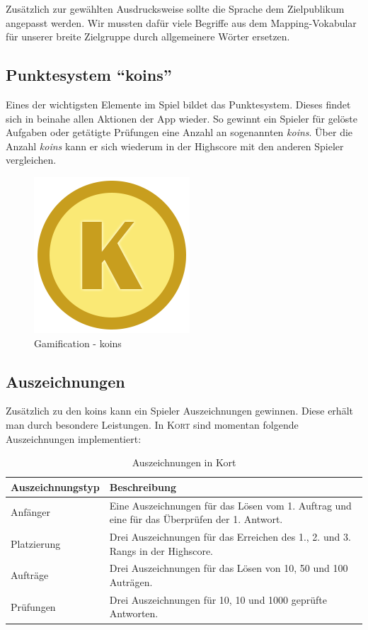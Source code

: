 Zusätzlich zur gewählten Ausdrucksweise sollte die Sprache dem Zielpublikum angepasst werden.
Wir mussten dafür viele Begriffe aus dem Mapping-Vokabular für unserer breite Zielgruppe durch allgemeinere Wörter ersetzen.

\subsection{Punktesystem "`koins"'}
Eines der wichtigsten Elemente im Spiel bildet das Punktesystem. Dieses findet sich in beinahe allen Aktionen der App wieder.
So gewinnt ein Spieler für gelöste Aufgaben oder getätigte Prüfungen eine Anzahl an sogenannten \emph{koins}.
Über die Anzahl \emph{koins} kann er sich wiederum in der Highscore mit den anderen Spieler vergleichen.

\begin{figure}[H]
	\centering
	\includegraphics[scale=0.4]{images/gamification/gamification-koin}
	\caption{Gamification - koins}
	\label{gamification-koins}
\end{figure}

\subsection{Auszeichnungen}
Zusätzlich zu den koins kann ein Spieler Auszeichnungen gewinnen. Diese erhält man durch besondere Leistungen. In \textsc{Kort} sind momentan folgende Auszeichnungen implementiert:

\begin{table}[H]
\centering
\begin{tabular}{|p{0.25\twocelltabwidth}|p{0.75\twocelltabwidth}|}
\hline 
\textbf{Auszeichnungstyp} & \textbf{Beschreibung} \\ 
\hline 
Anfänger & Eine Auszeichnungen für das Lösen vom 1. Auftrag und eine für das Überprüfen der 1. Antwort. \\ 
\hline 
Platzierung & Drei Auszeichnungen für das Erreichen des 1., 2. und 3. Rangs in der Highscore. \\ 
\hline 
Aufträge & Drei Auszeichnungen für das Lösen von 10, 50 und 100 Auträgen. \\ 
\hline 
Prüfungen & Drei Auszeichnungen für 10, 10 und 1000 geprüfte Antworten. \\ 
\hline 
\end{tabular} 
\caption{Auszeichnungen in Kort}
\label{kort-badges}
\end{table}

